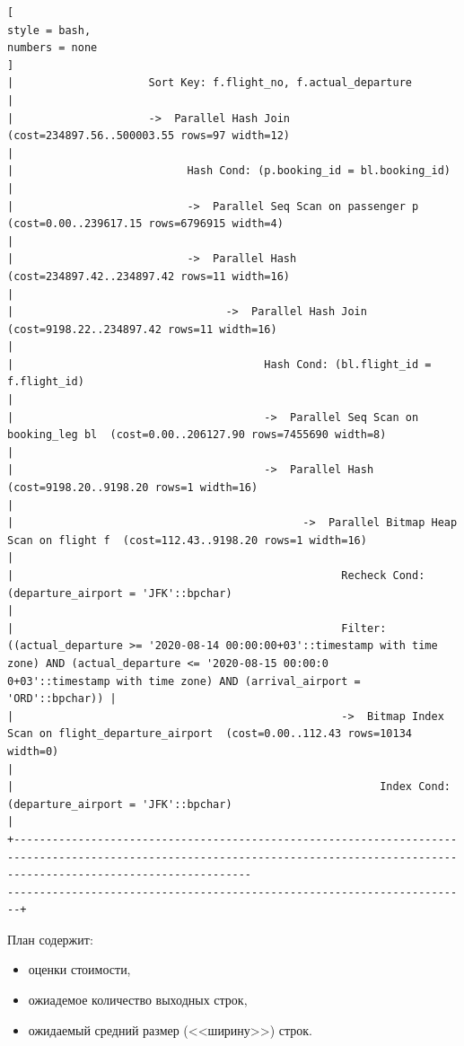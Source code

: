 \documentclass[%
	11pt,
	a4paper,
	utf8,
		]{article}
\begin{document}
\begin{lstlisting}[
style = bash,
numbers = none
]
|                     Sort Key: f.flight_no, f.actual_departure                                                                                                                                                                                           |
|                     ->  Parallel Hash Join  (cost=234897.56..500003.55 rows=97 width=12)                                                                                                                                                                |
|                           Hash Cond: (p.booking_id = bl.booking_id)
|
|                           ->  Parallel Seq Scan on passenger p  (cost=0.00..239617.15 rows=6796915 width=4)
|
|                           ->  Parallel Hash  (cost=234897.42..234897.42 rows=11 width=16)
|
|                                 ->  Parallel Hash Join  (cost=9198.22..234897.42 rows=11 width=16)
|
|                                       Hash Cond: (bl.flight_id = f.flight_id)
|
|                                       ->  Parallel Seq Scan on booking_leg bl  (cost=0.00..206127.90 rows=7455690 width=8)
|
|                                       ->  Parallel Hash  (cost=9198.20..9198.20 rows=1 width=16)
|
|                                             ->  Parallel Bitmap Heap Scan on flight f  (cost=112.43..9198.20 rows=1 width=16)
|
|                                                   Recheck Cond: (departure_airport = 'JFK'::bpchar)
|
|                                                   Filter: ((actual_departure >= '2020-08-14 00:00:00+03'::timestamp with time zone) AND (actual_departure <= '2020-08-15 00:00:0
0+03'::timestamp with time zone) AND (arrival_airport = 'ORD'::bpchar)) |
|                                                   ->  Bitmap Index Scan on flight_departure_airport  (cost=0.00..112.43 rows=10134 width=0)
|
|                                                         Index Cond: (departure_airport = 'JFK'::bpchar)
|
+---------------------------------------------------------------------------------------------------------------------------------------------------------------------------------
------------------------------------------------------------------------+
\end{lstlisting}


План содержит:
\begin{itemize}
	\item оценки стоимости,
	
	\item ожиадемое количество выходных строк,
	
	\item ожидаемый средний размер (<<ширину>>) строк.
\end{itemize}
\end{document}
